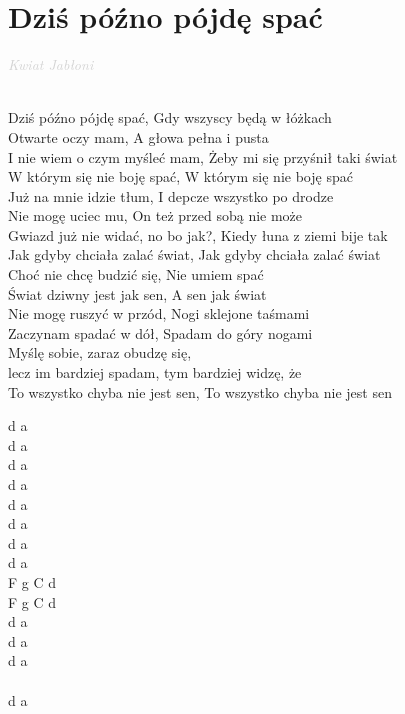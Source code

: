 \documentclass[a5paper, 10pt]{book}
\begin{document}
\newpage
\section{Dziś późno pójdę spać}\textcolor{lightgray}{\textit{Kwiat Jabłoni}}\\~\\
\begin{minipage}[t]{0.85\textwidth}
  Dziś późno pójdę spać, Gdy wszyscy będą w łóżkach\\
  Otwarte oczy mam, A głowa pełna i pusta\\
  I nie wiem o czym myśleć mam, Żeby mi się przyśnił taki świat\\
  W którym się nie boję spać, W którym się nie boję spać\\

  Już na mnie idzie tłum, I depcze wszystko po drodze\\
  Nie mogę uciec mu, On też przed sobą nie może\\
  Gwiazd już nie widać, no bo jak?, Kiedy łuna z ziemi bije tak\\
  Jak gdyby chciała zalać świat, Jak gdyby chciała zalać świat\\

  \hspace*{6mm} Choć nie chcę budzić się, Nie umiem spać\\
  \hspace*{6mm} Świat dziwny jest jak sen, A sen jak świat\\

  Nie mogę ruszyć w przód, Nogi sklejone taśmami\\
  Zaczynam spadać w dół, Spadam do góry nogami\\
  Myślę sobie, zaraz obudzę się, \\\hspace*{20mm}lecz im bardziej spadam, tym bardziej widzę, że\\
  To wszystko chyba nie jest sen, To wszystko chyba nie jest sen\\

\end{minipage}
\begin{minipage}[t]{0.15\textwidth}
  d a\\
  d a\\
  d a\\
  d a\\

  d a\\
  d a\\
  d a\\
  d a\\

  F g C d\\
  F g C d\\

  d a\\
  d a\\
  d a\\~\\
  d a\\

\end{minipage}
\end{document}
